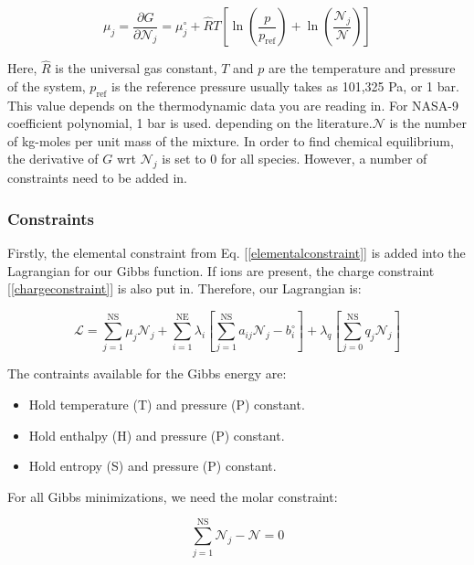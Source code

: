 \documentclass[10pt]{article}
\begin{document}
\begin{flushleft}
\begin{equation}
    \mu_j = \frac{\partial G}{\partial \mathcal{N}_j} = \mu_j^\circ + \hat{R}T \left[\ln\left(\frac{p}{p_\text{ref}}\right) + \ln \left( \frac{\mathcal{N}_j}{\mathcal{N}} \right) \right]
    \label{chempot}
\end{equation}

Here, $\hat{R}$ is the universal gas constant, $T$ and $p$ are the temperature and pressure of the system, $p_\text{ref}$ is the reference pressure usually takes as 101,325 Pa, or 1 bar. This value depends on the thermodynamic data you are reading in. For NASA-9 coefficient polynomial, 1 bar is used. depending on the literature.$\mathcal{N}$ is the number of kg-moles per unit mass of the mixture. In order to find chemical equilibrium, the derivative of $G$ wrt $\mathcal{N}_j$ is set to 0 for all species. However, a number of constraints need to be added in. 

\subsubsection{Constraints}

Firstly, the elemental constraint from Eq. [\ref{elementalconstraint}] is added into the Lagrangian for our Gibbs function. If ions are present, the charge constraint [\ref{chargeconstraint}] is also put in. Therefore, our Lagrangian is:

\begin{equation}
    \mathcal{L} = \sum_{j=1}^\text{NS} \mu_j\mathcal{N}_j + \sum_{i=1}^\text{NE}\lambda_i 
    \left[\sum_{j=1}^\text{NS}a_{ij} \mathcal{N}_j - b_i^\circ\right] + \lambda_q \left[ \sum_{j = 0}^\text{NS}q_j\mathcal{N}_j \right]
\end{equation}

The contraints available for the Gibbs energy are:

\begin{itemize}
\item Hold temperature (T) and pressure (P) constant.
\item Hold enthalpy (H) and pressure (P) constant.
\item Hold entropy (S) and pressure (P) constant.
\end{itemize}

For all Gibbs minimizations, we need the molar constraint:

\begin{equation}
    \sum_{j=1}^\text{NS} \mathcal{N}_j - \mathcal{N} = 0
\end{equation}



\end{flushleft}
\end{document}
